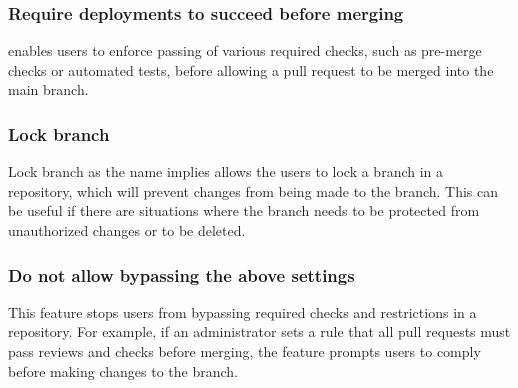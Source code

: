\subsubsection{Require deployments to succeed before merging}
enables users to enforce passing of various required checks, such as pre-merge checks or automated tests, before allowing a pull request to be merged into the main branch.

\subsubsection{Lock branch}
Lock branch as the name implies allows the users to lock a branch in a repository, which will prevent changes from being made to the branch. This can be useful if there are situations where the branch needs to be protected from unauthorized changes or to be deleted. 

\subsubsection{Do not allow bypassing the above settings}
This feature stops users from bypassing required checks and restrictions in a repository. For example, if an administrator sets a rule that all pull requests must pass reviews and checks before merging, the feature prompts users to comply before making changes to the branch.

